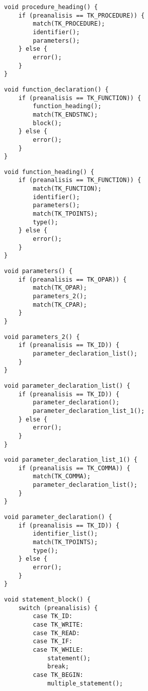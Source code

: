 \begin{multicols}{2}
\begin{verbatim}
void procedure_heading() {
	if (preanalisis == TK_PROCEDURE)) {
		match(TK_PROCEDURE);
		identifier();
		parameters();
	} else {
		error();
	}
}
\end{verbatim}
\begin{verbatim}
void function_declaration() {
	if (preanalisis == TK_FUNCTION)) {
		function_heading();
		match(TK_ENDSTNC);
		block();
	} else {
		error();
	}
}
\end{verbatim}
\begin{verbatim}
void function_heading() {
	if (preanalisis == TK_FUNCTION)) {
		match(TK_FUNCTION);
		identifier();
		parameters();
		match(TK_TPOINTS);
		type();
	} else {
		error();
	}
}
\end{verbatim}
\begin{verbatim}
void parameters() {
	if (preanalisis == TK_OPAR)) {
		match(TK_OPAR);
		parameters_2();
		match(TK_CPAR);
	}
}
\end{verbatim}
\begin{verbatim}
void parameters_2() {
	if (preanalisis == TK_ID)) {
		parameter_declaration_list();
	}
}
\end{verbatim}
\begin{verbatim}
void parameter_declaration_list() {
	if (preanalisis == TK_ID)) {
		parameter_declaration();
		parameter_declaration_list_1();
	} else {
		error();
	}
}
\end{verbatim}
\begin{verbatim}
void parameter_declaration_list_1() {
	if (preanalisis == TK_COMMA)) {
		match(TK_COMMA);
		parameter_declaration_list();
	}
}
\end{verbatim}
\begin{verbatim}
void parameter_declaration() {
	if (preanalisis == TK_ID)) {
		identifier_list();
		match(TK_TPOINTS);
		type();
	} else {
		error();
	}
}
\end{verbatim}
\begin{verbatim}
void statement_block() {
	switch (preanalisis) {
		case TK_ID:
		case TK_WRITE:
		case TK_READ:
		case TK_IF:
		case TK_WHILE:
			statement();
			break;
		case TK_BEGIN:
			multiple_statement();

\end{verbatim}
\end{multicols}
